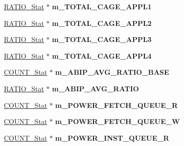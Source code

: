 \begin{DoxyCompactItemize}
\item 
\hypertarget{classall__stats__c_a2ebb0e6323a12c615d16fd04dbb6b3cc}{
\hyperlink{classRATIO__Stat}{RATIO\_\-Stat} $\ast$ {\bfseries m\_\-TOTAL\_\-CAGE\_\-APPL1}}
\label{classall__stats__c_a2ebb0e6323a12c615d16fd04dbb6b3cc}

\item 
\hypertarget{classall__stats__c_afe7813d6968a9a8de1512011b5caecb4}{
\hyperlink{classRATIO__Stat}{RATIO\_\-Stat} $\ast$ {\bfseries m\_\-TOTAL\_\-CAGE\_\-APPL2}}
\label{classall__stats__c_afe7813d6968a9a8de1512011b5caecb4}

\item 
\hypertarget{classall__stats__c_ab7ad726306ae5c007f211d704108ebf6}{
\hyperlink{classRATIO__Stat}{RATIO\_\-Stat} $\ast$ {\bfseries m\_\-TOTAL\_\-CAGE\_\-APPL3}}
\label{classall__stats__c_ab7ad726306ae5c007f211d704108ebf6}

\item 
\hypertarget{classall__stats__c_a3566a3002eec376212ecea1d870dddf6}{
\hyperlink{classRATIO__Stat}{RATIO\_\-Stat} $\ast$ {\bfseries m\_\-TOTAL\_\-CAGE\_\-APPL4}}
\label{classall__stats__c_a3566a3002eec376212ecea1d870dddf6}

\item 
\hypertarget{classall__stats__c_af035f9c5f29ad3e781859c772538cbfa}{
\hyperlink{classCOUNT__Stat}{COUNT\_\-Stat} $\ast$ {\bfseries m\_\-ABIP\_\-AVG\_\-RATIO\_\-BASE}}
\label{classall__stats__c_af035f9c5f29ad3e781859c772538cbfa}

\item 
\hypertarget{classall__stats__c_abfbde5f76d572efa84a7f3501ab827ba}{
\hyperlink{classRATIO__Stat}{RATIO\_\-Stat} $\ast$ {\bfseries m\_\-ABIP\_\-AVG\_\-RATIO}}
\label{classall__stats__c_abfbde5f76d572efa84a7f3501ab827ba}

\item 
\hypertarget{classall__stats__c_a631704b7e2cb8b434b8b4d3cb3d1a898}{
\hyperlink{classCOUNT__Stat}{COUNT\_\-Stat} $\ast$ {\bfseries m\_\-POWER\_\-FETCH\_\-QUEUE\_\-R}}
\label{classall__stats__c_a631704b7e2cb8b434b8b4d3cb3d1a898}

\item 
\hypertarget{classall__stats__c_a6dfe84f9180e4a1003833505ea8d7a80}{
\hyperlink{classCOUNT__Stat}{COUNT\_\-Stat} $\ast$ {\bfseries m\_\-POWER\_\-FETCH\_\-QUEUE\_\-W}}
\label{classall__stats__c_a6dfe84f9180e4a1003833505ea8d7a80}

\item 
\hypertarget{classall__stats__c_abd803c7ef03bab0aa249802d28d935e5}{
\hyperlink{classCOUNT__Stat}{COUNT\_\-Stat} $\ast$ {\bfseries m\_\-POWER\_\-INST\_\-QUEUE\_\-R}}
\label{classall__stats__c_abd803c7ef03bab0aa249802d28d935e5}


\end{DoxyCompactItemize}
